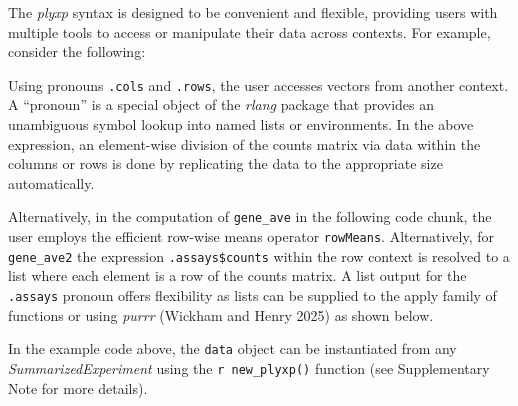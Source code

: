 \documentclass[
  letterpaper,
  DIV=11,
  numbers=noendperiod]{scrartcl}
\newenvironment{Shaded}{\begin{snugshade}}{\end{snugshade}}
\newcommand{\AttributeTok}[1]{\textcolor[rgb]{0.40,0.45,0.13}{#1}}
\newcommand{\FunctionTok}[1]{\textcolor[rgb]{0.28,0.35,0.67}{#1}}
\newcommand{\NormalTok}[1]{\textcolor[rgb]{0.00,0.23,0.31}{#1}}
\newcommand{\SpecialCharTok}[1]{\textcolor[rgb]{0.37,0.37,0.37}{#1}}
\begin{document}
The \emph{plyxp} syntax is designed to be convenient and flexible,
providing users with multiple tools to access or manipulate their data
across contexts. For example, consider the following:

\begin{Shaded}
\end{Shaded}

Using pronouns \texttt{.cols} and \texttt{.rows}, the user accesses
vectors from another context. A ``pronoun'' is a special object of the
\emph{rlang} package that provides an unambiguous symbol lookup into
named lists or environments. In the above expression, an element-wise
division of the counts matrix via data within the columns or rows is
done by replicating the data to the appropriate size automatically.

Alternatively, in the computation of \texttt{gene\_ave} in the following
code chunk, the user employs the efficient row-wise means operator
\texttt{rowMeans}. Alternatively, for \texttt{gene\_ave2} the expression
\texttt{.assays\$counts} within the row context is resolved to a list
where each element is a row of the counts matrix. A list output for the
\texttt{.assays} pronoun offers flexibility as lists can be supplied to
the apply family of functions or using \emph{purrr} (Wickham and Henry
2025) as shown below.

\begin{Shaded}
\end{Shaded}

In the example code above, the \texttt{data} object can be instantiated
from any \emph{SummarizedExperiment} using the \texttt{r\ new\_plyxp()}
function (see Supplementary Note for more details).
\end{document}
